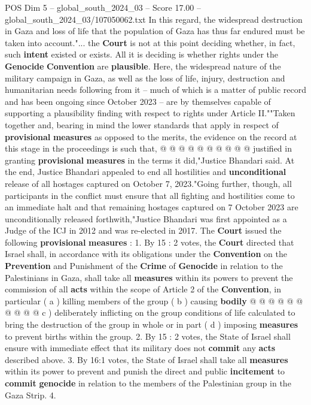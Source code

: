 \begin{textsample}{POS Dim 5 – global\_south\_2024\_03 – Score 17.00 – global\_south\_2024\_03/107050062.txt}
In this regard, the widespread destruction in Gaza and loss of life that the population of Gaza has thus far endured must be taken into account."... the \textbf{Court} is not at this point deciding whether, in fact, such \textbf{intent} existed or exists.
All it is deciding is whether rights under the \textbf{Genocide} \textbf{Convention} are \textbf{plausible}.
Here, the widespread nature of the military campaign in Gaza, as well as the loss of life, injury, destruction and humanitarian needs following from it -- much of which is a matter of public record and has been ongoing since October 2023 -- are by themselves capable of supporting a plausibility finding with respect to rights under Article II.""Taken together and, bearing in mind the lower standards that apply in respect of \textbf{provisional} \textbf{measures} as opposed to the merits, the evidence on the record at this stage in the proceedings is such that, @ @ @ @ @ @ @ @ @ @ justified in granting \textbf{provisional} \textbf{measures} in the terms it did,"Justice Bhandari said.
At the end, Justice Bhandari appealed to end all hostilities and \textbf{unconditional} release of all hostages captured on October 7, 2023."Going further, though, all participants in the conflict must ensure that all fighting and hostilities come to an immediate halt and that remaining hostages captured on 7 October 2023 are unconditionally released forthwith,"Justice Bhandari was first appointed as a Judge of the ICJ in 2012 and was re-elected in 2017.
The \textbf{Court} issued the following \textbf{provisional} \textbf{measures} : 1.
By 15 : 2 votes, the \textbf{Court} directed that Israel shall, in accordance with its obligations under the \textbf{Convention} on the \textbf{Prevention} and Punishment of the \textbf{Crime} of \textbf{Genocide} in relation to the Palestinians in Gaza, shall take all \textbf{measures} within its powers to prevent the commission of all \textbf{acts} within the scope of Article 2 of the \textbf{Convention}, in particular ( a ) killing members of the group ( b ) causing \textbf{bodily} @ @ @ @ @ @ @ @ @ @ c ) deliberately inflicting on the group conditions of life calculated to bring the destruction of the group in whole or in part ( d ) imposing \textbf{measures} to prevent births within the group. 2.
By 15 : 2 votes, the State of Israel shall ensure with immediate effect that its military does not \textbf{commit} any \textbf{acts} described above. 3.
By 16:1 votes, the State of Israel shall take all \textbf{measures} within its power to prevent and punish the direct and public \textbf{incitement} to \textbf{commit} \textbf{genocide} in relation to the members of the Palestinian group in the Gaza Strip. 4.

\end{textsample}
